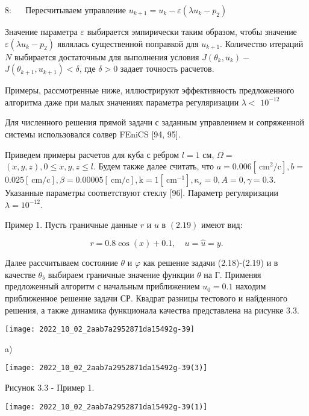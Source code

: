 \documentclass[10pt]{article}
\begin{document}
8: $\quad$ Пересчитываем управление $u_{k+1}=u_{k}-\varepsilon\left(\lambda u_{k}-p_{2}\right)$

Значение параметра $\varepsilon$ выбирается эмпирически таким образом, чтобы значение $\varepsilon\left(\lambda u_{k}-p_{2}\right)$ являлась существенной поправкой для $u_{k+1}$. Количество итераций $N$ выбирается достаточным для выполнения условия $J\left(\theta_{k}, u_{k}\right)-$ $J\left(\theta_{k+1}, u_{k+1}\right)<\delta$, где $\delta>0$ задает точность расчетов.

Примеры, рассмотренные ниже, иллюстрируют эффективность предложенного алгоритма даже при малых значениях параметра регуляризации $\lambda<$ $10^{-12}$

Для численного решения прямой задачи с заданным управлением и сопряженной системы использовался солвер FEniCS [94, 95].

Приведем примеры расчетов для куба с ребром $l=1$ см, $\Omega=$ $(x, y, z), 0 \leqslant x, y, z \leqslant l$. Будем также далее считать, что $a=0.006\left[\mathrm{~cm}^{2} / \mathrm{c}\right], b=$ $0.025[\mathrm{~cm} / \mathrm{c}], \beta=0.00005[\mathrm{~cm} / \mathrm{c}], \mathrm{k}=1\left[\mathrm{~cm}^{-1}\right], \mathrm{\kappa}_{s}=0, A=0, \gamma=0.3$. Указанные параметры соответствуют стеклу [96]. Параметр регуляризации $\lambda=10^{-12}$.

Пример 1. Пусть граничные данные $r$ и $u$ в $(2.19)$ имеют вид:

$$
r=0.8 \cos (x)+0.1, \quad u=\hat{u}=y .
$$

Далее рассчитываем состояние $\theta$ и $\varphi$ как решение задачи (2.18)-(2.19) и в качестве $\theta_{b}$ выбираем граничные значение функции $\theta$ на Г. Применяя предложенный алгоритм с начальным приближением $u_{0}=0.1$ находим приближенное решение задачи СР. Квадрат разницы тестового и найденного решения, а также динамика функционала качества представлена на рисунке 3.3.

\begin{center}
\texttt{[image: 2022\_10\_02\_2aab7a2952871da15492g-39]}
\end{center}

a)

\begin{center}
\texttt{[image: 2022\_10\_02\_2aab7a2952871da15492g-39(3)]}
\end{center}

Рисунок $3.3$ - Пример 1.

\begin{center}
\texttt{[image: 2022\_10\_02\_2aab7a2952871da15492g-39(1)]}
\end{center}
\end{document}
